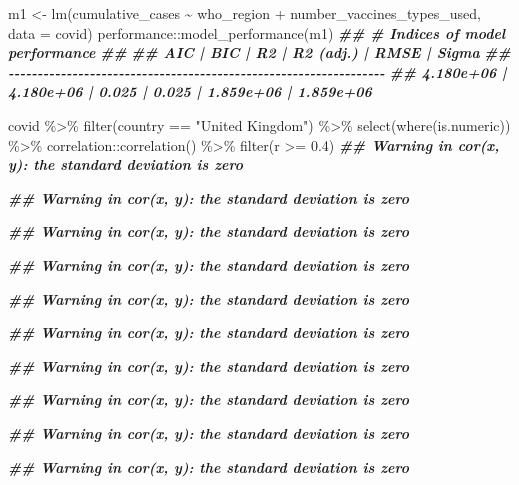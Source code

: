 \documentclass[
]{book}
\newenvironment{Shaded}{\begin{snugshade}}{\end{snugshade}}
\newcommand{\AttributeTok}[1]{\textcolor[rgb]{0.77,0.63,0.00}{#1}}
\newcommand{\DocumentationTok}[1]{\textcolor[rgb]{0.56,0.35,0.01}{\textbf{\textit{#1}}}}
\newcommand{\FloatTok}[1]{\textcolor[rgb]{0.00,0.00,0.81}{#1}}
\newcommand{\FunctionTok}[1]{\textcolor[rgb]{0.00,0.00,0.00}{#1}}
\newcommand{\NormalTok}[1]{#1}
\newcommand{\OtherTok}[1]{\textcolor[rgb]{0.56,0.35,0.01}{#1}}
\newcommand{\SpecialCharTok}[1]{\textcolor[rgb]{0.00,0.00,0.00}{#1}}
\newcommand{\StringTok}[1]{\textcolor[rgb]{0.31,0.60,0.02}{#1}}
\begin{document}
\begin{Shaded}
\begin{Highlighting}[]
\NormalTok{m1 }\OtherTok{\textless{}{-}} \FunctionTok{lm}\NormalTok{(cumulative\_cases }\SpecialCharTok{\textasciitilde{}}\NormalTok{ who\_region }\SpecialCharTok{+}\NormalTok{ number\_vaccines\_types\_used, }\AttributeTok{data =}\NormalTok{ covid)}
\NormalTok{performance}\SpecialCharTok{::}\FunctionTok{model\_performance}\NormalTok{(m1)}
\DocumentationTok{\#\# \# Indices of model performance}
\DocumentationTok{\#\# }
\DocumentationTok{\#\# AIC       |       BIC |    R2 | R2 (adj.) |      RMSE |     Sigma}
\DocumentationTok{\#\# {-}{-}{-}{-}{-}{-}{-}{-}{-}{-}{-}{-}{-}{-}{-}{-}{-}{-}{-}{-}{-}{-}{-}{-}{-}{-}{-}{-}{-}{-}{-}{-}{-}{-}{-}{-}{-}{-}{-}{-}{-}{-}{-}{-}{-}{-}{-}{-}{-}{-}{-}{-}{-}{-}{-}{-}{-}{-}{-}{-}{-}{-}{-}{-}{-}}
\DocumentationTok{\#\# 4.180e+06 | 4.180e+06 | 0.025 |     0.025 | 1.859e+06 | 1.859e+06}

\NormalTok{covid }\SpecialCharTok{\%\textgreater{}\%}
  \FunctionTok{filter}\NormalTok{(country }\SpecialCharTok{==} \StringTok{"United Kingdom"}\NormalTok{) }\SpecialCharTok{\%\textgreater{}\%} 
  \FunctionTok{select}\NormalTok{(}\FunctionTok{where}\NormalTok{(is.numeric)) }\SpecialCharTok{\%\textgreater{}\%}
\NormalTok{  correlation}\SpecialCharTok{::}\FunctionTok{correlation}\NormalTok{() }\SpecialCharTok{\%\textgreater{}\%} 
  \FunctionTok{filter}\NormalTok{(r }\SpecialCharTok{\textgreater{}=} \FloatTok{0.4}\NormalTok{)}
\DocumentationTok{\#\# Warning in cor(x, y): the standard deviation is zero}

\DocumentationTok{\#\# Warning in cor(x, y): the standard deviation is zero}

\DocumentationTok{\#\# Warning in cor(x, y): the standard deviation is zero}

\DocumentationTok{\#\# Warning in cor(x, y): the standard deviation is zero}

\DocumentationTok{\#\# Warning in cor(x, y): the standard deviation is zero}

\DocumentationTok{\#\# Warning in cor(x, y): the standard deviation is zero}

\DocumentationTok{\#\# Warning in cor(x, y): the standard deviation is zero}

\DocumentationTok{\#\# Warning in cor(x, y): the standard deviation is zero}

\DocumentationTok{\#\# Warning in cor(x, y): the standard deviation is zero}

\DocumentationTok{\#\# Warning in cor(x, y): the standard deviation is zero}


\end{Highlighting}
\end{Shaded}
\end{document}
